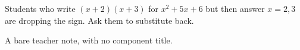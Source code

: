 \begin{teachernote}[Warm-Up]
Students who write $(x+2)(x+3)$ for $x^2+5x+6$ but then answer $x=2,3$ are dropping
the sign. Ask them to substitute back.
\end{teachernote}
\begin{teachernote}
A bare teacher note, with no component title.
\end{teachernote}
